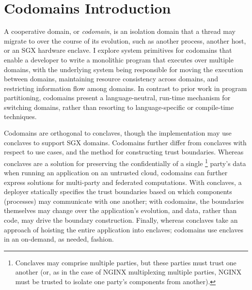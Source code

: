 \section{Codomains Introduction}
\label{sec:codomains-intro}

A cooperative domain, or \emph{codomain}, is an isolation domain
that a thread may migrate to over the course of its evolution, such as another
process, another host, or an SGX hardware enclave.
%
I explore system primitives for codomains that enable a developer to write a
monolithic program that executes over multiple domains, with the underlying
system being responsible for moving the execution between domains, maintaining
resource consistency across domains, and restricting information flow among
domains.
%
In contrast to prior work in program partitioning, codomains present
a language-neutral, run-time mechanism for switching domains, rather than
resorting to language-specific or compile-time techniques.



Codomains are orthogonal to conclaves, though the implementation may
use conclaves to support SGX domains.
%
Codomains further differ from conclaves with respect to use cases, and the
method for constructing trust boundaries.
%
Whereas conclaves are a solution for preserving the confidentially of a single
\footnote{
Conclaves may comprise
multiple parties, but these parties must trust one another (or, as in
the case of NGINX multiplexing multiple parties, NGINX must be trusted
to isolate one party's components from another).
}
party's data when running an application on an untrusted cloud,
%
codomains can further express solutions for multi-party and
federated computations.
%
With conclaves, a deployer statically specifies the trust boundaries based on
which components (processes) may communicate with one another;
%
%
with codomains, the boundaries themselves may change over
the application's evolution, and data, rather than code, may drive the boundary
construction.
%
Finally, whereas conclaves take an approach of hoisting the entire application
into enclaves; codomains use enclaves in an on-demand, as needed, fashion.







